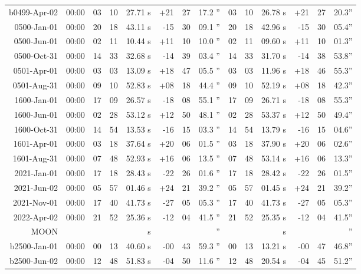 \begin{longtable}{r@{\,}r|r@{h\,}r@{m\,}r<{s}|r@{°\,}r@{'\,}r<{''}||r@{h\,}r@{m\,}r<{s}|r@{°\,}r@{'\,}r<{''}}
b0499-Apr-02 & 00:00  &   03 & 10 & 27.71 & +21 & 27 & 17.2 & 03&10&26.78 & +21&27&20.3\\ %
 0500-Jan-01 & 00:00  &   20 & 18 & 43.11 & -15 & 30 & 09.1 & 20&18&42.96 & -15&30&05.4\\ %
 0500-Jun-01 & 00:00  &   02 & 11 & 10.44 & +11 & 10 & 10.0 & 02&11&09.60 & +11&10&01.3\\ %
 0500-Oct-31 & 00:00  &   14 & 33 & 32.68 & -14 & 39 & 03.4 & 14&33&31.70 & -14&38&53.8\\ %
 0501-Apr-01 & 00:00  &   03 & 03 & 13.09 & +18 & 47 & 05.5 & 03&03&11.96 & +18&46&55.3\\ %
 0501-Aug-31 & 00:00  &   09 & 10 & 52.83 & +08 & 18 & 44.4 & 09&10&52.19 & +08&18&42.3\\ %
 1600-Jan-01 & 00:00  &   17 & 09 & 26.57 & -18 & 08 & 55.1 & 17&09&26.71 & -18&08&55.3\\ %
 1600-Jun-01 & 00:00  &   02 & 28 & 53.12 & +12 & 50 & 48.1 & 02&28&53.37 & +12&50&49.4\\ %
 1600-Oct-31 & 00:00  &   14 & 54 & 13.53 & -16 & 15 & 03.3 & 14&54&13.79 & -16&15&04.6\\ %
 1601-Apr-01 & 00:00  &   03 & 18 & 37.64 & +20 & 06 & 01.5 & 03&18&37.90 & +20&06&02.6\\ %
 1601-Aug-31 & 00:00  &   07 & 48 & 52.93 & +16 & 06 & 13.5 & 07&48&53.14 & +16&06&13.3\\ %
 2021-Jan-01 & 00:00  &   17 & 18 & 28.43 & -22 & 26 & 01.6 & 17&18&28.42 & -22&26&01.5\\ %
 2021-Jun-02 & 00:00  &   05 & 57 & 01.46 & +24 & 21 & 39.2 & 05&57&01.45 & +24&21&39.2\\ %
 2021-Nov-01 & 00:00  &   17 & 40 & 41.73 & -27 & 05 & 05.3 & 17&40&41.73 & -27&05&05.3\\ %
 2022-Apr-02 & 00:00  &   21 & 52 & 25.36 & -12 & 04 & 41.5 & 21&52&25.35 & -12&04&41.5\\ %
MOON   \\
b2500-Jan-01 & 00:00  &   00 & 13 & 40.60 & -00 & 43 & 59.3 & 00&13&13.21 & -00&47&46.8\\ %
b2500-Jun-02 & 00:00  &   12 & 48 & 51.83 & -04 & 50 & 11.6 & 12&48&20.54 & -04&45&51.2\\ %

\end{longtable}
